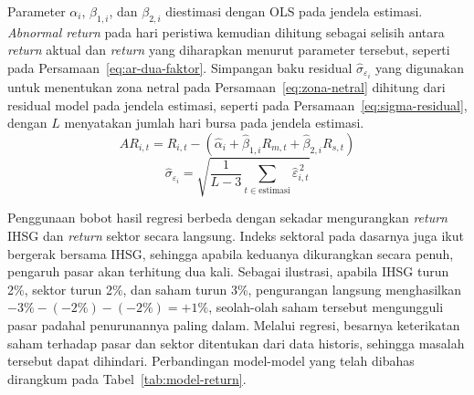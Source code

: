 Parameter $\alpha_i$, $\beta_{1,i}$, dan $\beta_{2,i}$ diestimasi dengan OLS pada jendela estimasi. \emph{Abnormal return} pada hari peristiwa kemudian dihitung sebagai selisih antara \emph{return} aktual dan \emph{return} yang diharapkan menurut parameter tersebut, seperti pada Persamaan~\ref{eq:ar-dua-faktor}. Simpangan baku residual $\hat{\sigma}_{\varepsilon_i}$ yang digunakan untuk menentukan zona netral pada Persamaan~\ref{eq:zona-netral} dihitung dari residual model pada jendela estimasi, seperti pada Persamaan~\ref{eq:sigma-residual}, dengan $L$ menyatakan jumlah hari bursa pada jendela estimasi.
\begin{equation}
AR_{i,t} = R_{i,t} - \left(\hat{\alpha}_i + \hat{\beta}_{1,i} R_{m,t} + \hat{\beta}_{2,i} R_{s,t}\right)
\label{eq:ar-dua-faktor}
\end{equation}
\begin{equation}
\hat{\sigma}_{\varepsilon_i} = \sqrt{\frac{1}{L - 3} \sum_{t \in \text{estimasi}} \hat{\varepsilon}_{i,t}^{\,2}}
\label{eq:sigma-residual}
\end{equation}

Penggunaan bobot hasil regresi berbeda dengan sekadar mengurangkan \emph{return} IHSG dan \emph{return} sektor secara langsung. Indeks sektoral pada dasarnya juga ikut bergerak bersama IHSG, sehingga apabila keduanya dikurangkan secara penuh, pengaruh pasar akan terhitung dua kali. Sebagai ilustrasi, apabila IHSG turun 2\%, sektor turun 2\%, dan saham turun 3\%, pengurangan langsung menghasilkan $-3\% - (-2\%) - (-2\%) = +1\%$, seolah-olah saham tersebut mengungguli pasar padahal penurunannya paling dalam. Melalui regresi, besarnya keterikatan saham terhadap pasar dan sektor ditentukan dari data historis, sehingga masalah tersebut dapat dihindari. Perbandingan model-model yang telah dibahas dirangkum pada Tabel~\ref{tab:model-return}.

